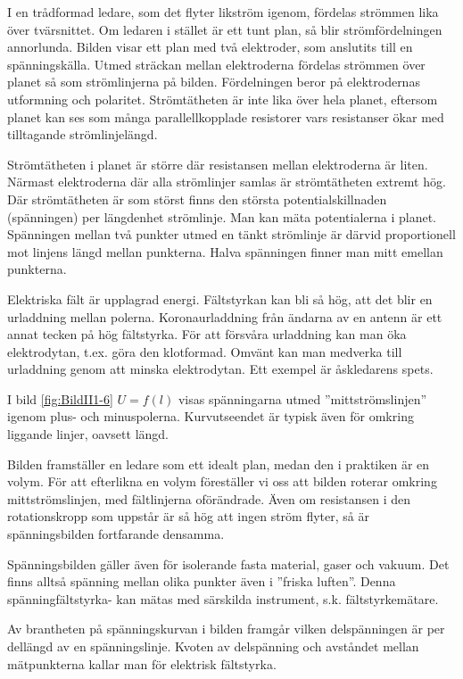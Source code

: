 I en trådformad ledare, som det flyter likström igenom, fördelas strömmen lika
över tvärsnittet.
Om ledaren i stället är ett tunt plan, så blir strömfördelningen annorlunda.
Bilden visar ett plan med två elektroder, som anslutits till en spänningskälla.
Utmed sträckan mellan elektroderna fördelas strömmen över planet så som
strömlinjerna på bilden.
Fördelningen beror på elektrodernas utformning och polaritet.
Strömtätheten är inte lika över hela planet, eftersom planet kan ses som många
parallellkopplade resistorer vars resistanser ökar med tilltagande
strömlinjelängd.

Strömtätheten i planet är större där resistansen mellan elektroderna är liten.
Närmast elektroderna där alla strömlinjer samlas är strömtätheten extremt hög.
Där strömtätheten är som störst finns den största potentialskillnaden
(spänningen) per längdenhet strömlinje.
Man kan mäta potentialerna i planet.
Spänningen mellan två punkter utmed en tänkt strömlinje är därvid proportionell
mot linjens längd mellan punkterna.
Halva spänningen finner man mitt emellan punkterna.

Elektriska fält är upplagrad energi.
Fältstyrkan kan bli så hög, att det blir en urladdning mellan polerna.
Koronaurladdning från ändarna av en antenn är ett annat tecken på hög
fältstyrka.
För att försvåra urladdning kan man öka elektrodytan, t.ex. göra den klotformad.
Omvänt kan man medverka till urladdning genom att minska elektrodytan.
Ett exempel är åskledarens spets.

I bild \ref{fig:BildII1-6} \(U = f(l)\) visas spänningarna utmed
''mittströmslinjen'' igenom plus- och minuspolerna.
Kurvutseendet är typisk även för omkring liggande linjer, oavsett längd.

Bilden framställer en ledare som ett idealt plan, medan den i praktiken är en
volym.
För att efterlikna en volym föreställer vi oss att bilden roterar omkring
mittströmslinjen, med fältlinjerna oförändrade.
Även om resistansen i den rotationskropp som uppstår är så hög att ingen ström
flyter, så är spänningsbilden fortfarande densamma.

Spänningsbilden gäller även för isolerande fasta material, gaser och vakuum.
Det finns alltså spänning mellan olika punkter även i ''friska luften''.
Denna spänningfältstyrka- kan mätas med särskilda instrument, s.k.
fältstyrkemätare.

Av brantheten på spänningskurvan i bilden framgår vilken delspänningen är per
dellängd av en spänningslinje.
Kvoten av delspänning och avståndet mellan mätpunkterna kallar man för
elektrisk fältstyrka.

